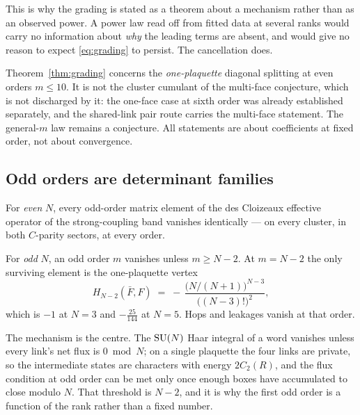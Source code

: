 This is why the grading is stated as a theorem about a mechanism rather
than as an observed power. A power law read off from fitted data at
several ranks would carry no information about \emph{why} the leading
terms are absent, and would give no reason to expect
\eqref{eq:grading} to persist. The cancellation does.

\begin{scopenote}
Theorem~\ref{thm:grading} concerns the \emph{one-plaquette} diagonal
splitting at even orders $m \le 10$. It is not the cluster cumulant of
the multi-face conjecture, which is not discharged by it: the one-face
case at sixth order was already established separately, and the
shared-link pair route carries the multi-face statement. The general-$m$
law remains a conjecture. All statements are about coefficients at fixed
order, not about convergence.
\end{scopenote}

\subsection{Odd orders are determinant families}

\begin{theorem}
\label{thm:centreparity}
For \emph{even} $N$, every odd-order matrix element of the des Cloizeaux
effective operator of the strong-coupling band vanishes identically ---
on every cluster, in both $C$-parity sectors, at every order.

For \emph{odd} $N$, an odd order $m$ vanishes unless $m \ge N-2$. At
$m = N-2$ the only surviving element is the one-plaquette vertex
\begin{equation}
  H_{N-2}(\bar F, F)
  \;=\; -\,\frac{\big(N/(N+1)\big)^{N-3}}{\big((N-3)!\big)^2},
  \label{eq:centrevertex}
\end{equation}
which is $-1$ at $N = 3$ and $-\tfrac{25}{144}$ at $N = 5$. Hops and
leakages vanish at that order.
\end{theorem}

The mechanism is the centre. The $\mathrm{SU}(N)$ Haar integral of a word
vanishes unless every link's net flux is $0 \bmod N$; on a single
plaquette the four links are private, so the intermediate states are
characters with energy $2C_2(R)$, and the flux condition at odd order
can be met only once enough boxes have accumulated to close modulo $N$.
That threshold is $N-2$, and it is why the first odd order is a
function of the rank rather than a fixed number.

